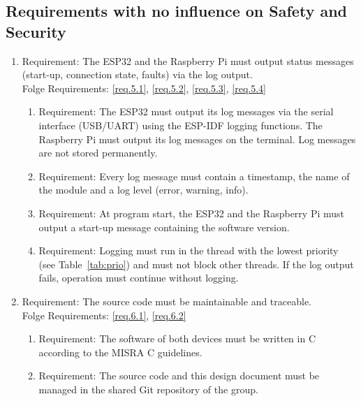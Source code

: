 \subsection{Requirements with no influence on Safety and Security}

	\begin{enumerate}[label*=\arabic*., start=5]
		\item \label{req.5} Requirement: The ESP32 and the Raspberry Pi must output status messages (start-up, connection state, faults) via the log output. \\
		Folge Requirements: \ref{req.5.1}, \ref{req.5.2}, \ref{req.5.3}, \ref{req.5.4}
		\begin{enumerate}[label*=\arabic*.]
			\item \label{req.5.1} Requirement: The ESP32 must output its log messages via the serial interface (USB/UART) using the ESP-IDF logging functions. The Raspberry Pi must output its log messages on the terminal. Log messages are not stored permanently.
			\item \label{req.5.2} Requirement: Every log message must contain a timestamp, the name of the module and a log level (error, warning, info).
			\item \label{req.5.3} Requirement: At program start, the ESP32 and the Raspberry Pi must output a start-up message containing the software version.
			\item \label{req.5.4} Requirement: Logging must run in the thread with the lowest priority (see Table~\ref{tab:prio}) and must not block other threads. If the log output fails, operation must continue without logging.
		\end{enumerate}

		\item \label{req.6} Requirement: The source code must be maintainable and traceable. \\
		Folge Requirements: \ref{req.6.1}, \ref{req.6.2}
		\begin{enumerate}[label*=\arabic*.]
			\item \label{req.6.1} Requirement: The software of both devices must be written in C according to the MISRA C guidelines.
			\item \label{req.6.2} Requirement: The source code and this design document must be managed in the shared Git repository of the group.
		\end{enumerate}
	\end{enumerate}